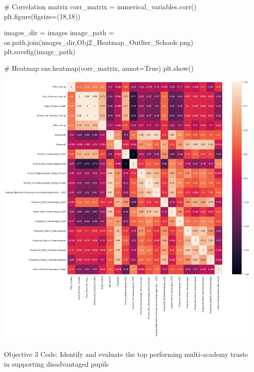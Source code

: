 \documentclass[
  letterpaper,
  DIV=11,
  numbers=noendperiod]{scrartcl}
\makeatletter
\let\oldparagraph\paragraph
\renewcommand{\paragraph}{
    \@ifstar
      \xxxParagraphStar
      \xxxParagraphNoStar
  }
\newcommand{\xxxParagraphStar}[1]{\oldparagraph*{#1}\mbox{}}
\newcommand{\xxxParagraphNoStar}[1]{\oldparagraph{#1}\mbox{}}
\newenvironment{Shaded}{\begin{snugshade}}{\end{snugshade}}
\newcommand{\CommentTok}[1]{\textcolor[rgb]{0.37,0.37,0.37}{#1}}
\newcommand{\DecValTok}[1]{\textcolor[rgb]{0.68,0.00,0.00}{#1}}
\newcommand{\NormalTok}[1]{\textcolor[rgb]{0.00,0.23,0.31}{#1}}
\newcommand{\OperatorTok}[1]{\textcolor[rgb]{0.37,0.37,0.37}{#1}}
\newcommand{\StringTok}[1]{\textcolor[rgb]{0.13,0.47,0.30}{#1}}
\newcommand{\VariableTok}[1]{\textcolor[rgb]{0.07,0.07,0.07}{#1}}
\makeatother
\begin{document}
\begin{Shaded}
\begin{Highlighting}[]

\CommentTok{\# Correlation matrix}
\NormalTok{corr\_matrix }\OperatorTok{=}\NormalTok{ numerical\_variables.corr()}
\NormalTok{plt.figure(figsize}\OperatorTok{=}\NormalTok{(}\DecValTok{18}\NormalTok{,}\DecValTok{18}\NormalTok{))}

\NormalTok{images\_dir }\OperatorTok{=} \StringTok{\textquotesingle{}images\textquotesingle{}}
\NormalTok{image\_path }\OperatorTok{=}\NormalTok{ os.path.join(images\_dir,}\StringTok{\textquotesingle{}Obj2\_Heatmap\_Outlier\_Schools.png\textquotesingle{}}\NormalTok{)}
\NormalTok{plt.savefig(image\_path)}


\CommentTok{\# Heatmap}
\NormalTok{sns.heatmap(corr\_matrix, annot}\OperatorTok{=}\VariableTok{True}\NormalTok{)}
\NormalTok{plt.show()}
\end{Highlighting}
\end{Shaded}

\includegraphics{P4DS_A2_Data_Analysis_Project_files/figure-pdf/cell-93-output-1.png}

\paragraph{Objective 3 Code: Identify and evaluate the top performing
multi-academy trusts in supporting disadvantaged
pupils}\label{objective-3-code-identify-and-evaluate-the-top-performing-multi-academy-trusts-in-supporting-disadvantaged-pupils}
\end{document}
